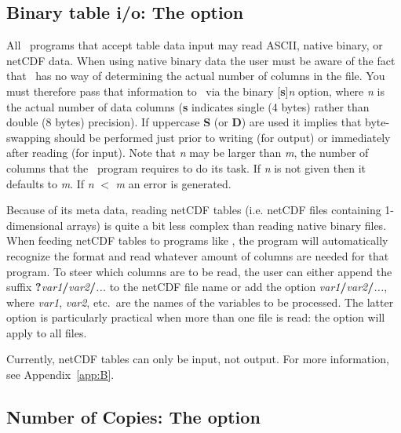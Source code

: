 \subsection{Binary table i/o: The  option}

All \GMT\ programs that accept table data input may read ASCII, native binary, or netCDF data.
When using native binary data the user must be aware
of the fact that \GMT\ has no way of determining the actual
number of columns in the file.  You must therefore pass that
information to \GMT\ via the binary [\textbf{s}]\emph{n} option,
where \emph{n} is the actual number of data columns (\textbf{s}
indicates single (4 bytes) rather than double (8 bytes) precision).  If uppercase
\textbf{S} (or \textbf{D}) are used it implies that byte-swapping should be performed
just prior to writing (for output) or immediately after  reading (for input).
Note that \emph{n} may be larger than \emph{m}, the number of
columns that the \GMT\ program requires to do its task.
If \emph{n} is not given then it defaults to \emph{m}.
If \emph{n} $<$ \emph{m} an error is generated.

Because of its meta data, reading netCDF tables (i.e. netCDF files containing 1-dimensional arrays)
is quite a bit less complex than reading native binary files. When feeding netCDF tables to programs
like , the program will automatically recognize the format and read whatever amount of
columns are needed for that program. To steer which columns are to be read, the user can either
append the suffix \textbf{?}\emph{var1}\textbf{/}\emph{var2}\textbf{/}\emph{...} to the netCDF file name
or add the option \emph{var1}\textbf{/}\emph{var2}\textbf{/}\emph{...}, where \emph{var1}, \emph{var2}, etc.\
are the names of the variables to be processed. The latter option is particularly practical when more
than one file is read: the \Opt{bic} option will apply to all files.

Currently, netCDF tables can only be input, not output.
For more information, see Appendix~\ref{app:B}.

\subsection{Number of Copies: The  option}

